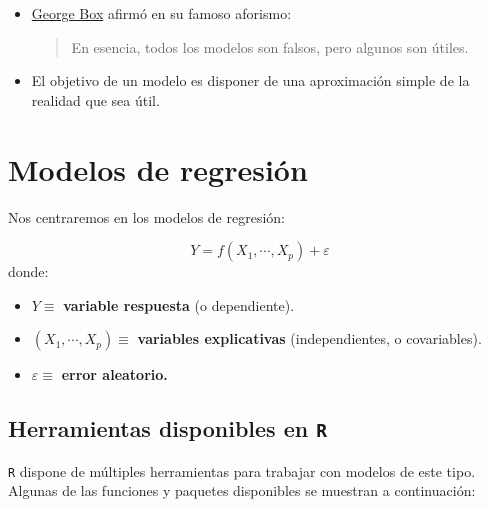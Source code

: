\documentclass[
]{book}
\theoremstyle{break}
\begin{document}
\begin{itemize}
\item
  \href{https://en.wikipedia.org/wiki/George_E._P._Box}{George Box} afirmó en su famoso aforismo:

  \begin{quote}
  En esencia, todos los modelos son falsos, pero algunos son útiles.
  \end{quote}
\item
  El objetivo de un modelo es disponer de una aproximación simple de la realidad que sea útil.
\end{itemize}

\hypertarget{modelos-de-regresiuxf3n}{%
\section{Modelos de regresión}\label{modelos-de-regresiuxf3n}}

Nos centraremos en los modelos de regresión:

\[Y=f(X_{1},\cdots,X_{p})+\varepsilon\]
donde:

\begin{itemize}
\item
  \(Y\equiv\) \textbf{variable respuesta} (o dependiente).
\item
  \(\left( X_{1},\cdots,X_{p}\right) \equiv\) \textbf{variables
  explicativas} (independientes, o covariables).
\item
  \(\varepsilon\equiv\) \textbf{error aleatorio.}
\end{itemize}

\hypertarget{herramientas-disponibles-en-r}{%
\subsection{\texorpdfstring{Herramientas disponibles en \texttt{R}}{Herramientas disponibles en R}}\label{herramientas-disponibles-en-r}}

\texttt{R} dispone de múltiples herramientas para trabajar con modelos de este tipo. Algunas de las funciones y paquetes disponibles se muestran a continuación:
\end{document}
